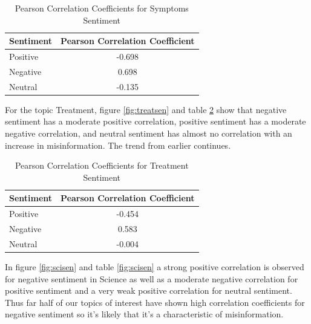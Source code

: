 \documentclass{l4proj}
\begin{document}
\begin{table}[h]
\begin{minipage}[c]{\linewidth}
\centering
\begin{tabular}{@{}ll@{}}
\toprule
Sentiment & Pearson Correlation Coefficient \\ \midrule
Positive  & \multicolumn{1}{c}{-0.698}      \\
Negative  & \multicolumn{1}{c}{0.698}       \\
Neutral   & \multicolumn{1}{c}{-0.135}       \\ \bottomrule
\end{tabular}
\caption{Pearson Correlation Coefficients for Symptoms Sentiment}
\label{tab:sympsen}
\end{minipage}\hfill
\end{table}

For the topic Treatment, figure \ref{fig:treatsen} and table \ref{tab:treatsen} show that negative sentiment has a moderate positive correlation, positive sentiment has a moderate negative correlation, and neutral sentiment has almost no correlation with an increase in misinformation. The trend from earlier continues.

\begin{table}[H]
\begin{minipage}[c]{\linewidth}
\centering
\begin{tabular}{@{}ll@{}}
\toprule
Sentiment & Pearson Correlation Coefficient \\ \midrule
Positive  & \multicolumn{1}{c}{-0.454}      \\
Negative  & \multicolumn{1}{c}{0.583}       \\
Neutral   & \multicolumn{1}{c}{-0.004}       \\ \bottomrule
\end{tabular}
\caption{Pearson Correlation Coefficients for Treatment Sentiment}
\label{tab:treatsen}
\end{minipage}\hfill
\end{table}

In figure \ref{fig:scisen} and table \ref{fig:scisen} a strong positive correlation is observed for negative sentiment in Science as well as a moderate negative correlation for positive sentiment and a very weak positive correlation for neutral sentiment. Thus far half of our topics of interest have shown high correlation coefficients for negative sentiment so it's likely that it's a characteristic of misinformation.
\end{document}
